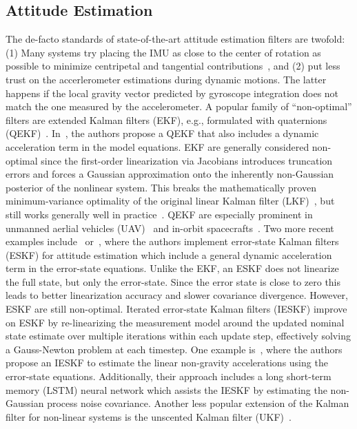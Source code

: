 \documentclass[journal]{IEEEtran}
\begin{document}
\subsection{Attitude Estimation}
The de-facto standards of state-of-the-art attitude estimation filters are twofold:
(1) Many systems try placing the IMU as close to the center of rotation as possible to minimize centripetal and tangential contributions~\cite{6957468}, and 
(2) put less trust on the accerlerometer estimations during dynamic motions.
The latter happens if the local gravity vector predicted by gyroscope integration does not match the one measured by the accelerometer.
A popular family of ``non-optimal'' filters are extended Kalman filters (EKF), e.g., formulated with quaternions (QEKF)~\cite{qekf}.
In~\cite{6172226}, the authors propose a QEKF that also includes a dynamic acceleration term in the model equations.
EKF are generally considered non-optimal since the first-order linearization via Jacobians introduces truncation errors and forces a Gaussian approximation onto the inherently non-Gaussian posterior of the nonlinear system.
This breaks the mathematically proven minimum-variance optimality of the original linear Kalman filter (LKF)~\cite{kalmanoriginal}, but still works generally well in practice~\cite{crassidis2007survey}.
QEKF are especially prominent in unmanned aerlial vehicles (UAV)~\cite{jing2017attitude, zhang2017attitude, hall2008quaternion} and in-orbit spacecrafts~\cite{lefferts1982kalman}.
Two more recent examples include~\cite{wei2025robust} or~\cite{chen2024robust}, where the authors implement error-state Kalman filters (ESKF) for attitude estimation which include a general dynamic acceleration term in the error-state equations.
Unlike the EKF, an ESKF does not linearize the full state, but only the error-state.
Since the error state is close to zero this leads to better linearization accuracy and slower covariance divergence.
However, ESKF are still non-optimal. 
Iterated error-state Kalman filters (IESKF) improve on ESKF by re-linearizing the measurement model around the updated nominal state estimate over multiple iterations within each update step, effectively solving a Gauss-Newton problem at each timestep.
One example is~\cite{10203029}, where the authors propose an IESKF to estimate the linear non-gravity accelerations using the error-state equations.
Additionally, their approach includes a long short-term memory (LSTM) neural network which assists the IESKF by estimating the non-Gaussian process noise covariance. 
Another less popular extension of the Kalman filter for non-linear systems is the unscented Kalman filter (UKF)~\cite{julier1997new}.
\end{document}
